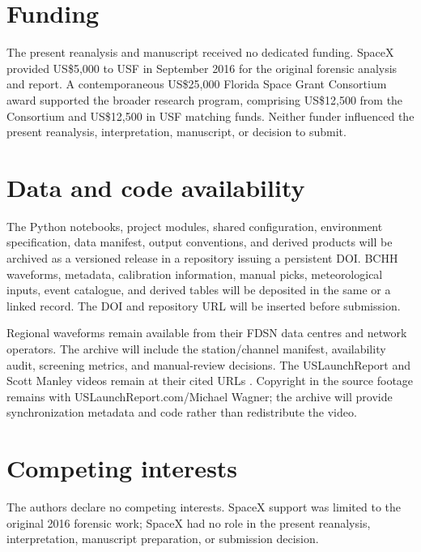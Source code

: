 \documentclass[]{seismica}
\begin{document}
\section*{Funding}

The present reanalysis and manuscript received no dedicated funding. SpaceX
provided US\$5,000 to USF in September 2016 for the original forensic analysis
and report. A contemporaneous US\$25,000 Florida Space Grant Consortium award
supported the broader research program, comprising US\$12,500 from the
Consortium and US\$12,500 in USF matching funds. Neither funder influenced the
present reanalysis, interpretation, manuscript, or decision to submit.

\section*{Data and code availability}

The Python notebooks, project modules, shared configuration, environment
specification, data manifest, output conventions, and derived products will be
archived as a versioned release in a repository issuing a persistent DOI. BCHH
waveforms, metadata, calibration information, manual picks, meteorological
inputs, event catalogue, and derived tables will be deposited in the same or a
linked record. The DOI and repository URL will be inserted before submission.

Regional waveforms remain available from their FDSN data centres and network
operators. The archive will include the station/channel manifest, availability
audit, screening metrics, and manual-review decisions. The USLaunchReport and
Scott Manley videos remain at their cited URLs
\citep{uslaunchreport_amos6_video_2016,manley_spacex_explosion_2016}. Copyright
in the source footage remains with USLaunchReport.com/Michael Wagner; the
archive will provide synchronization metadata and code rather than redistribute
the video.

\section*{Competing interests}

The authors declare no competing interests. SpaceX support was limited to the
original 2016 forensic work; SpaceX had no role in the present reanalysis,
interpretation, manuscript preparation, or submission decision.


\end{document}
